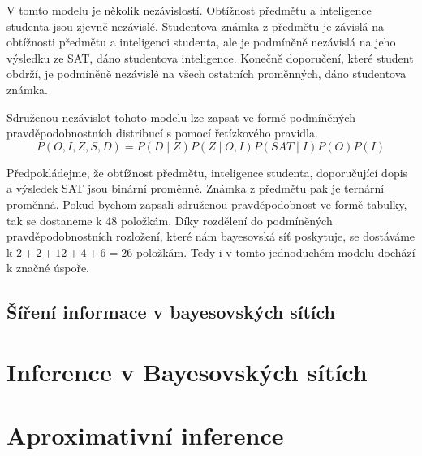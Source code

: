 V tomto modelu je několik nezávislostí. Obtížnost předmětu a inteligence studenta jsou zjevně nezávislé.
Studentova známka z předmětu je závislá na obtížnosti předmětu a inteligenci studenta, ale je podmíněně nezávislá na jeho výsledku ze SAT, dáno studentova inteligence.
Konečně doporučení, které student obdrží, je podmíněně nezávislé na všech ostatních proměnných, dáno studentova známka.

Sdruženou nezávislot tohoto modelu lze zapsat ve formě podmíněných pravděpodobnostních distribucí s pomocí řetízkového pravidla.
\begin{equation}
P(O, I, Z, S, D) = P(D \mid Z) P(Z \mid O, I) P(SAT \mid I) P(O) P(I)
\end{equation}

Předpokládejme, že obtížnost předmětu, inteligence studenta, doporučující dopis a výsledek SAT jsou binární proměnné.
Známka z předmětu pak je ternární proměnná.
Pokud bychom zapsali sdruženou pravděpodobnost ve formě tabulky, tak se dostaneme k 48 položkám.
Díky rozdělení do podmíněných pravděpodobnostních rozložení, které nám bayesovská síť poskytuje, se dostáváme k $2 + 2 + 12 + 4 + 6 = 26$ položkám.
Tedy i v tomto jednoduchém modelu dochází k značné úspoře.

\subsection{Šíření informace v bayesovských sítích}

\section{Inference v Bayesovských sítích}

\section{Aproximativní inference}
